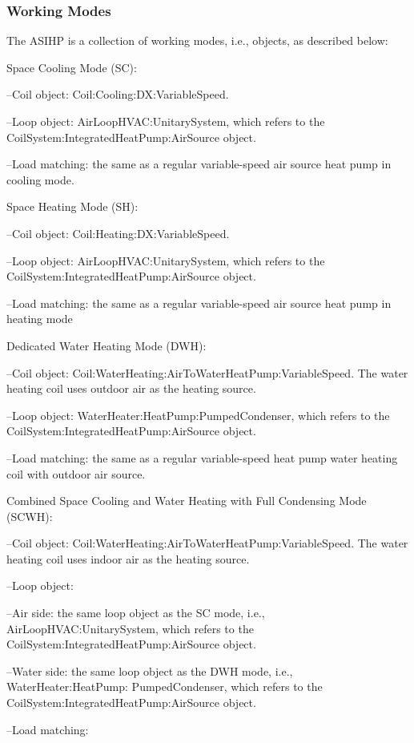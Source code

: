 \subsubsection{Working Modes}\label{Working-Modes-ASIHP}

The ASIHP is a collection of working modes, i.e., objects, as described below: 

Space Cooling Mode (SC):

--Coil object: Coil:Cooling:DX:VariableSpeed. 

--Loop object: AirLoopHVAC:UnitarySystem,  which refers to the CoilSystem:IntegratedHeatPump:AirSource object. 

--Load matching: the same as a regular variable-speed air source heat pump in cooling mode.

Space Heating Mode (SH):

--Coil object: Coil:Heating:DX:VariableSpeed.

--Loop object: AirLoopHVAC:UnitarySystem, which refers to the CoilSystem:IntegratedHeatPump:AirSource object. 

--Load matching: the same as a regular variable-speed air source heat pump in heating mode

Dedicated Water Heating Mode (DWH):

--Coil object: Coil:WaterHeating:AirToWaterHeatPump:VariableSpeed. The water heating coil uses outdoor air as the heating source. 

--Loop object: WaterHeater:HeatPump:PumpedCondenser, which refers to the CoilSystem:IntegratedHeatPump:AirSource object. 

--Load matching: the same as a regular variable-speed heat pump water heating coil with outdoor air source.

Combined Space Cooling and Water Heating with Full Condensing Mode (SCWH):

--Coil object: Coil:WaterHeating:AirToWaterHeatPump:VariableSpeed. The water heating coil uses indoor air as the heating source. 

--Loop object: 

--Air side: the same loop object as the SC mode, i.e., AirLoopHVAC:UnitarySystem, which refers to the CoilSystem:IntegratedHeatPump:AirSource object. 

--Water side: the same loop object as the DWH mode, i.e., WaterHeater:HeatPump: PumpedCondenser, which refers to the CoilSystem:IntegratedHeatPump:AirSource object. 

--Load matching: 

